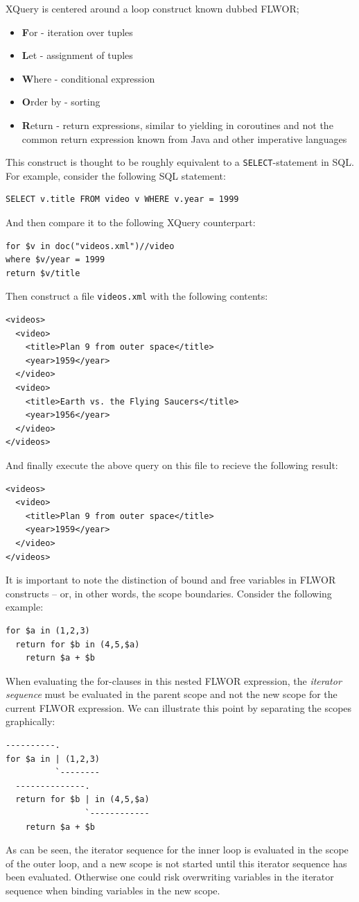 XQuery is centered around a loop construct known dubbed FLWOR;
\begin{itemize}
  \item \textbf{F}or - iteration over tuples
  \item \textbf{L}et - assignment of tuples
  \item \textbf{W}here - conditional expression
  \item \textbf{O}rder by - sorting 
  \item \textbf{R}eturn - return expressions, similar to yielding in coroutines
  and not the common return expression known from Java and other imperative
  languages
\end{itemize}
This construct is thought to be roughly equivalent to a
\texttt{SELECT}-statement in SQL. For example, consider the following SQL
statement: 
\begin{Verbatim}
SELECT v.title FROM video v WHERE v.year = 1999
\end{Verbatim}
And then compare it to the following XQuery counterpart:
\begin{Verbatim}
for $v in doc("videos.xml")//video
where $v/year = 1999
return $v/title
\end{Verbatim}
Then construct a file \texttt{videos.xml} with the following contents:
\begin{Verbatim}
<videos>
  <video>
    <title>Plan 9 from outer space</title>
    <year>1959</year>
  </video>
  <video>
    <title>Earth vs. the Flying Saucers</title>
    <year>1956</year>
  </video>
</videos>
\end{Verbatim}
And finally execute the above query on this file to recieve the following
result:
\begin{Verbatim}
<videos>
  <video>
    <title>Plan 9 from outer space</title>
    <year>1959</year>
  </video>
</videos>
\end{Verbatim}

It is important to note the distinction of bound and free variables in FLWOR
constructs -- or, in other words, the scope boundaries. Consider the following
example:
\begin{Verbatim}
for $a in (1,2,3)
  return for $b in (4,5,$a)
    return $a + $b
\end{Verbatim}
When evaluating the for-clauses in this nested FLWOR expression, the
\textit{iterator sequence} must be evaluated in the parent scope and not the
new scope for the current FLWOR expression. We can illustrate this point by
separating the scopes graphically:
\begin{Verbatim}
----------.
for $a in | (1,2,3)
          `--------
  --------------.
  return for $b | in (4,5,$a)
                `------------
    return $a + $b
\end{Verbatim}
As can be seen, the iterator sequence for the inner loop is evaluated in the
scope of the outer loop, and a new scope is not started until this iterator
sequence has been evaluated. Otherwise one could risk overwriting variables in
the iterator sequence when binding variables in the new scope.


